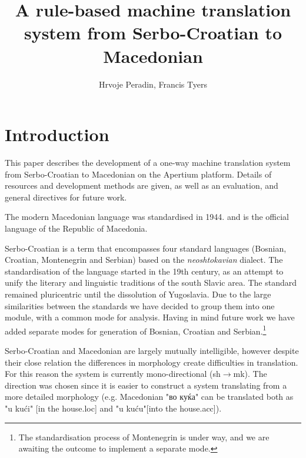 \documentclass{book}
\title{A rule-based machine translation system from Serbo-Croatian to Macedonian}
\author{Hrvoje Peradin, Francis Tyers}
\begin{document}
\frontmatter      %

\maketitle

\setcounter{page}{5}
\setcounter{tocdepth}{0}  %

\chapter{Introduction}

This paper describes the development of a one-way machine translation system
from Serbo-Croatian to Macedonian on the Apertium
platform.
Details of resources and development methods are given, as well as an
evaluation, and general directives for future work.

The modern Macedonian language was standardised in 1944. and
is the official language of the Republic of Macedonia.

Serbo-Croatian is a term that encompasses four standard languages 
(Bosnian, Croatian, Montenegrin and Serbian) based on the 
\emph{neoshtokavian} dialect. The standardisation of the language started
in the 19th century, as an attempt to unify the literary and linguistic 
traditions of the south Slavic area. The standard remained pluricentric
until the dissolution of Yugoslavia. Due to the large similarities between 
the standards we have decided to group them into one module, with a common
mode for analysis. Having in mind future work we have added separate modes 
for generation of Bosnian, Croatian and Serbian.\footnote{The standardisation
process of Montenegrin is under way, and we are awaiting the outcome to implement a separate
mode.}

Serbo-Croatian and Macedonian are largely mutually intelligible, however despite their close relation the differences in morphology 
create difficulties in translation. For this reason the system is currently mono-directional (sh$\rightarrow$mk). 
The direction was chosen since it is easier to construct a system translating from a more detailed morphology 
(e.g. Macedonian "во куќа" can be translated both as "u kući" [in the house{\sc .loc}] and "u kuću"[into the house{\sc .acc}]).
\end{document}

